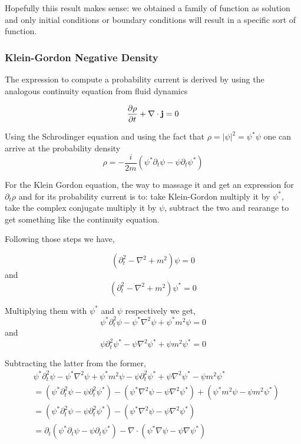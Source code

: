 Hopefully thiis result makes sense: we obtained a family of function as solution and only initial conditions or
boundary conditions will result in a specific sort of function.




\subsubsection{Klein-Gordon Negative Density}


The expression to compute a probability current is derived by using the analogous continuity equation
from fluid dynamics

$$
\frac{\partial\rho}{\partial t} + \nabla\cdot \boldsymbol{\mathbf{j}} = 0
$$


Using the Schrodinger equation and using the fact that $\rho = |\psi|^2 = \psi^* \psi$ one
can arrive at the probability density
$$
\rho = 
-\frac{i}{2m} \left( \psi^* \partial_t \psi - \psi \partial_t \psi^* \right)
$$

For the Klein Gordon equation, the way to massage it and get an expression for $\partial_t \rho$
and for its probability current is to:
take Klein-Gordon multiply it by $\psi^*$,
take the complex conjugate multiply it by $\psi$,
subtract the two and rearange to get something like the continuity equation.

Following those steps we have,

$$
\left( \partial_{t}^{2} - \nabla^2 + m^2 \right) \psi = 0
$$
and
$$
\left( \partial_{t}^{2} - \nabla^2 + m^2 \right) \psi^* = 0
$$

Multiplying them with $\psi^*$ and $\psi$ respectively we get,
$$
\psi^* \partial_{t}^{2} \psi - \psi^* \nabla^2 \psi + \psi^* m^2 \psi = 0
$$
and
$$
\psi \partial_{t}^{2} \psi^* - \psi \nabla^2 \psi^* + \psi m^2 \psi^* = 0
$$

Subtracting the latter from the former,
\begin{align*}
& \psi^* \partial_{t}^{2} \psi - \psi^* \nabla^2 \psi + \psi^* m^2 \psi -
    \psi \partial_{t}^{2} \psi^* + \psi \nabla^2 \psi^* - \psi m^2 \psi^* \\
&= \left( \psi^* \partial_{t}^{2} \psi - \psi \partial_{t}^{2} \psi^* \right)
    - \left( \psi^* \nabla^2 \psi - \psi \nabla^2 \psi^* \right)
    + \left( \psi^* m^2 \psi - \psi m^2 \psi^* \right) \\
&= \left( \psi^* \partial_{t}^{2} \psi - \psi \partial_{t}^{2} \psi^* \right)
    - \left( \psi^* \nabla^2 \psi - \psi \nabla^2 \psi^* \right) \\
&= \partial_t \left( \psi^* \partial_{t} \psi - \psi \partial_{t} \psi^* \right)
    -\nabla \cdot \left( \psi^* \nabla \psi - \psi \nabla \psi^* \right)
\end{align*}

